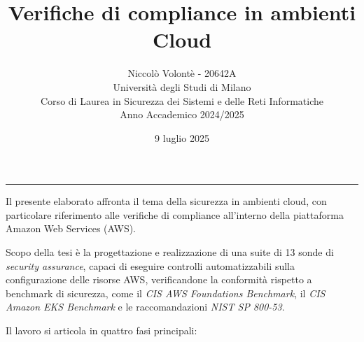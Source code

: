 \documentclass[11pt,a4paper]{article}
\title{\bfseries Verifiche di compliance in ambienti Cloud}
\author{Niccolò Volontè - 20642A\\
\normalsize Università degli Studi di Milano\\
\normalsize Corso di Laurea in Sicurezza dei Sistemi e delle Reti Informatiche\\
\normalsize Anno Accademico 2024/2025}
\date{9 luglio 2025}
\begin{document}
\maketitle
\vspace{1em}
\hrule
\vspace{1em}
Il presente elaborato affronta il tema della sicurezza in ambienti cloud, con particolare riferimento alle verifiche di compliance all'interno della piattaforma Amazon Web Services (AWS). 

Scopo della tesi è la progettazione e realizzazione di una suite di 13 sonde di \emph{security assurance}, capaci di eseguire controlli automatizzabili sulla configurazione delle risorse AWS, verificandone la conformità rispetto a benchmark di sicurezza, come il \emph{CIS AWS Foundations Benchmark}, il \emph{CIS Amazon EKS Benchmark} e le raccomandazioni \emph{NIST SP 800-53}.

Il lavoro si articola in quattro fasi principali:
\end{document}
